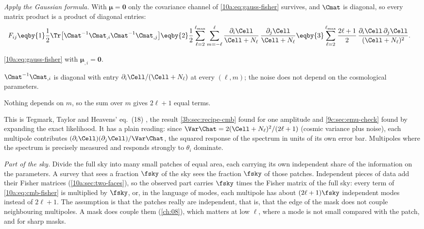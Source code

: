 \emph{Apply the Gaussian formula.} With $\bm\mu=\bm0$ only the covariance channel of \eqref{10a:eq:gauss-fisher}
survives, and $\Cmat$ is diagonal, so every matrix product is a product of diagonal entries:
\begin{align}
  F_{ij}
  &\eqby{1}\frac12\Tr\bigl[\Cmat^{-1}\Cmat_{,i}\Cmat^{-1}\Cmat_{,j}\bigr]
  \eqby{2}\frac12\sum_{\ell=2}^{\ell_{\max}}\sum_{m=-\ell}^{\ell}\frac{\partial_i\Cell}{\Cell+N_\ell}\,\frac{\partial_j\Cell}{\Cell+N_\ell}
  \eqby{3}\sum_{\ell=2}^{\ell_{\max}}\frac{2\ell+1}{2}\,\frac{\partial_i\Cell\,\partial_j\Cell}{(\Cell+N_\ell)^2} .
  \label{10a:eq:cmb-fisher}
\end{align}
\begin{explain}
  \item \eqref{10a:eq:gauss-fisher} with $\bm\mu_{,i}=\bm0$.
  \item $\Cmat^{-1}\Cmat_{,i}$ is diagonal with entry $\partial_i\Cell/(\Cell+N_\ell)$ at every $(\ell,m)$; the noise does not depend
        on the cosmological parameters.
  \item Nothing depends on $m$, so the sum over $m$ gives $2\ell+1$ equal terms.
\end{explain}
This is Tegmark, Taylor and Heavens' eq.~(18) \cite{TTH1997}, the result \cref{3b:sec:recipe-cmb} found for one
amplitude and \cref{9c:sec:emu-check} found by expanding the exact likelihood. It has a plain reading: since
$\Var\Chat=2(\Cell+N_\ell)^2/(2\ell+1)$ (cosmic variance plus noise), each multipole contributes
$(\partial_i\Cell)(\partial_j\Cell)/\Var\Chat$, the squared response of the spectrum in units of its own error bar. Multipoles
where the spectrum is precisely measured and responds strongly to $\theta_i$ dominate.

\emph{Part of the sky.} Divide the full sky into many small patches of equal area, each carrying its own
independent share of the information on the parameters. A survey that sees a fraction $\fsky$ of the sky sees the
fraction $\fsky$ of those patches. Independent pieces of data add their Fisher matrices (\cref{10a:sec:two-faces}), so
the observed part carries $\fsky$ times the Fisher matrix of the full sky: every term of \eqref{10a:eq:cmb-fisher} is
multiplied by $\fsky$, or, in the language of modes, each multipole has about $(2\ell+1)\fsky$ independent modes
instead of $2\ell+1$. The assumption is that the patches really are independent, that is, that the edge of the
mask does not couple neighbouring multipoles. A mask does couple them (\cref{ch:08}), which matters at low $\ell$,
where a mode is not small compared with the patch, and for sharp masks.


